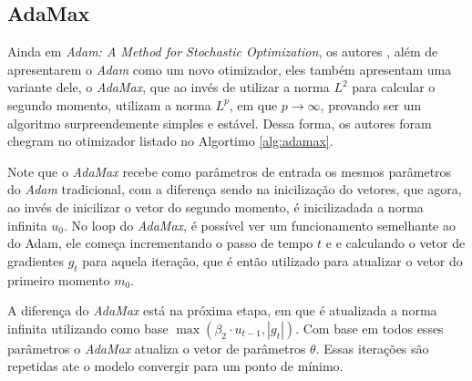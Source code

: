 \subsection{AdaMax} 

Ainda em \textit{Adam: A Method for Stochastic Optimization}, os autores \textcite{AdamMethod}, além de apresentarem o \textit{Adam} como um novo otimizador, eles também apresentam uma variante dele, o \textit{AdaMax}, que ao invés de utilizar a norma $L^2$ para calcular o segundo momento, utilizam a norma $L^p$, em que $p \to \infty$, provando ser um algoritmo surpreendemente simples e estável. Dessa forma, os autores foram chegram no otimizador listado no Algortimo \ref{alg:adamax}.

Note que o \textit{AdaMax} recebe como parâmetros de entrada os mesmos parâmetros do \textit{Adam} tradicional, com a diferença sendo na inicilização do vetores, que agora, ao invés de inicilizar o vetor do segundo momento, é inicilizadada a norma infinita $u_0$. No loop do \textit{AdaMax}, é possível ver um funcionamento semelhante ao do Adam, ele começa incrementando o passo de tempo $t$ e e calculando o vetor de gradientes $g_t$ para aquela iteração, que é então utilizado para atualizar o vetor do primeiro momento $m_0$.

A diferença do \textit{AdaMax} está na próxima etapa, em que é atualizada a norma infinita utilizando como base $\max(\beta_2 \cdot u_{t-1}, |g_t|)$. Com base em todos esses parâmetros o \textit{AdaMax} atualiza o vetor de parâmetros $\theta$. Essas iterações são repetidas ate o modelo convergir para um ponto de mínimo.

